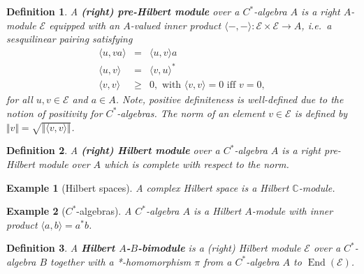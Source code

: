 \documentclass[12pt]{article}
\newcommand*{\Cset}{\mathbb{C}}
\newcommand*{\norm}[1]{\Vert #1\Vert}
\newcommand*{\hilbmod}[1][E]{\mathord{\mathcal{#1}}}
\newcommand*{\End}{\mathop{\mathrm{End}}\nolimits}
\theoremstyle{inlinedefn}
\newtheorem{definition}{Definition}
\theoremstyle{break}
\newtheorem{example}{Example}
\begin{document}
\begin{definition}
A \textbf{(right) pre-Hilbert module} over a $C^*$-algebra $A$ is a right $A$-module $\hilbmod$
equipped with an $A$-valued inner product $\langle-,-\rangle\colon \hilbmod \times \hilbmod \to A$,
i.e.\ a sesquilinear pairing satisfying
\begin{eqnarray}
\langle u,va\rangle & = & \langle u,v\rangle a \\
\langle u,v\rangle & = & \langle v,u\rangle^* \\
\langle v,v\rangle & \geq & 0, \mbox{ with\ } \langle v,v\rangle = 0 \mbox{ iff\ } v = 0,
\end{eqnarray}
for all $u,v \in \hilbmod$ and $a \in A$.
Note, positive definiteness is well-defined due to the notion of positivity for $C^*$-algebras.
The norm of an element $v \in \hilbmod$ is defined by $\norm{v} = \sqrt{\norm{\langle v,v\rangle}}$.
\end{definition}

\begin{definition}
A \textbf{(right) Hilbert module} over a $C^*$-algebra $A$ is a right pre-Hilbert module over $A$ which is complete with respect to the norm.
\end{definition}

\begin{example}[Hilbert spaces]
A complex Hilbert space is a Hilbert $\Cset$-module.
\end{example}

\begin{example}[$C^*$-algebras]
A $C^*$-algebra $A$ is a Hilbert $A$-module with inner product
$\langle a,b\rangle = a^*b$.
\end{example}

\begin{definition}
A \textbf{Hilbert $A$-$B$-bimodule} is a (right) Hilbert module $\hilbmod$ over a $C^*$-algebra $B$ together with a *-homomorphism $\pi$ from a $C^*$-algebra $A$ to $\End(\hilbmod)$.
\end{definition}
\end{document}
